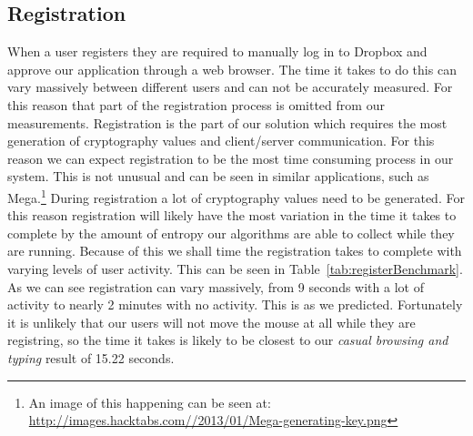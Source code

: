 \documentclass[12pt, titlepage]{article}
\begin{document}
\subsection{Registration}
When a user registers they are required to manually log in to Dropbox and approve our application through a web browser. The time it takes to do this can vary massively between different users and can not be accurately measured. For this reason that part of the registration process is omitted from our measurements. 
\newline \indent Registration is the part of our solution which requires the most generation of cryptography values and client/server communication. For this reason we can expect registration to be the most time consuming process in our system. This is not unusual and can be seen in similar applications, such as Mega.\footnote{An image of this happening can be seen at: \url{http://images.hacktabs.com//2013/01/Mega-generating-key.png}}
\newline \indent During registration a lot of cryptography values need to be generated. For this reason registration will likely have the most variation in the time it takes to complete by the amount of entropy our algorithms are able to collect while they are running. Because of this we shall time the registration takes to complete with varying levels of user activity. This can be seen in Table~\ref{tab:registerBenchmark}. As we can see registration can vary massively, from 9 seconds with a lot of activity to nearly 2 minutes with no activity. This is as we predicted. Fortunately it is unlikely that our users will not move the mouse at all while they are registring, so the time it takes is likely to be closest to our \textit{casual browsing and typing} result of 15.22 seconds.
\end{document}
